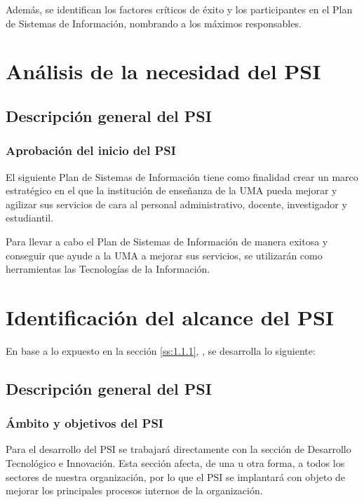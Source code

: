 \documentclass[11pt,a4paper,spanish,twoside]{book}
\begin{document}
Además, se identifican los factores críticos de éxito y los participantes en
el Plan de Sistemas de Información, nombrando a los máximos responsables.

\section{Análisis de la necesidad del PSI}
\subsection{Descripción general del PSI}\label{ss:1.1.1}
\subsubsection{Aprobación del inicio del PSI}
El siguiente Plan de Sistemas de Información tiene como finalidad crear un 
marco estratégico en el que la institución de enseñanza de la UMA pueda
mejorar y agilizar sus servicios de cara al personal administrativo, docente, 
investigador y estudiantil.

Para llevar a cabo el Plan de Sistemas de Información de manera exitosa y 
conseguir que ayude a la UMA a mejorar sus servicios, se utilizarán como 
herramientas las Tecnologías de la Información.

\section{Identificación del alcance del PSI}
En base a lo expuesto en la sección \vref{ss:1.1.1}, \emph{},
se desarrolla lo siguiente:

\subsection{Descripción general del PSI}\label{ss:1.2.1}
\subsubsection{Ámbito y objetivos del PSI}
Para el desarrollo del PSI se trabajará directamente con la sección de 
Desarrollo Tecnológico e Innovación. Esta sección afecta, de una u otra
forma, a todos los sectores de nuestra organización, por lo que el PSI se
implantará con objeto de mejorar los principales procesos internos de la
organización.
\end{document}
